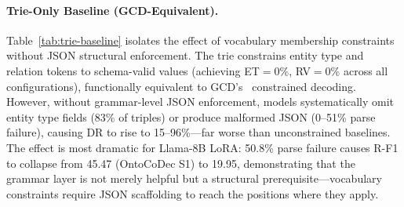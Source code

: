 \begin{table}[h]
\centering
\small
{}
\caption{Lucky violation analysis across four LoRA fine-tuned configurations.
Lucky: count (and \% of gold triples) of constraint-removed violations matching gold labels.
$\Delta$Recall: recall change from unconstrained to constrained.
Churn: fraction of gold-matching triples whose predictions change (including recovery via legal type paths).}
\label{tab:lucky-violations}
\end{table}


\paragraph{Trie-Only Baseline (GCD-Equivalent).}
\label{app:trie-baseline}
Table~\ref{tab:trie-baseline} isolates the effect of vocabulary membership constraints without JSON structural enforcement.
The trie constrains entity type and relation tokens to schema-valid values (achieving ET${=}$0\%, RV${=}$0\% across all configurations), functionally equivalent to GCD's~\cite{geng2023gcd} constrained decoding.
However, without grammar-level JSON enforcement, models systematically omit entity type fields (83\% of triples) or produce malformed JSON (0--51\% parse failure), causing DR to rise to 15--96\%---far worse than unconstrained baselines.
The effect is most dramatic for Llama-8B LoRA: 50.8\% parse failure causes R-F1 to collapse from 45.47 (OntoCoDec S1) to 19.95, demonstrating that the grammar layer is not merely helpful but a structural prerequisite---vocabulary constraints require JSON scaffolding to reach the positions where they apply.

